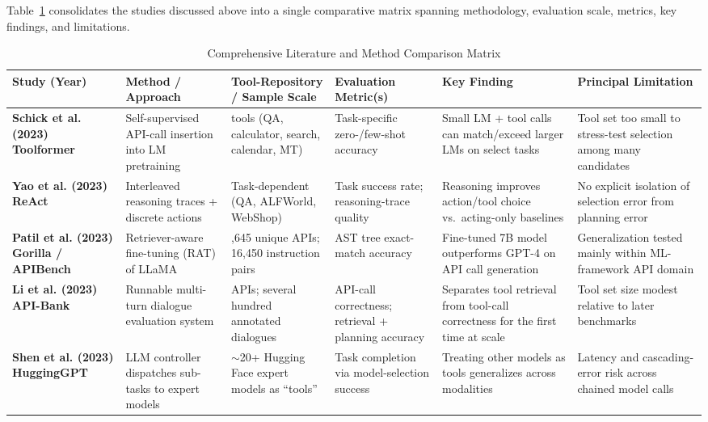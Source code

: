 \documentclass[acmsmall]{acmart}
\begin{document}
Table~\ref{tab:comparison} consolidates the studies discussed above into a single comparative matrix spanning methodology, evaluation scale, metrics, key findings, and limitations.

\begin{table}[!t]
  \centering
  \caption{Comprehensive Literature and Method Comparison Matrix}
  \label{tab:comparison}
  \setlength{\tabcolsep}{2pt}
  \renewcommand{\arraystretch}{0.82}
  \scriptsize
  \begin{tabularx}{\textwidth}{@{}>{\raggedright\arraybackslash}X>{\raggedright\arraybackslash}X>{\raggedright\arraybackslash}X>{\raggedright\arraybackslash}X>{\raggedright\arraybackslash}X>{\raggedright\arraybackslash}X@{}}
    \toprule
    \textbf{Study (Year)} & \textbf{Method / Approach} & \textbf{Tool-Repository / Sample Scale} & \textbf{Evaluation Metric(s)} & \textbf{Key Finding} & \textbf{Principal Limitation} \\
    \midrule
    \textbf{Schick et al. (2023) Toolformer} & Self-supervised API-call insertion into LM pretraining & 5 tools (QA, calculator, search, calendar, MT) & Task-specific zero-/few-shot accuracy & Small LM + tool calls can match/exceed larger LMs on select tasks & Tool set too small to stress-test selection among many candidates \\
    \textbf{Yao et al. (2023) ReAct} & Interleaved reasoning traces + discrete actions & Task-dependent (QA, ALFWorld, WebShop) & Task success rate; reasoning-trace quality & Reasoning improves action/tool choice vs.\ acting-only baselines & No explicit isolation of selection error from planning error \\
    \textbf{Patil et al. (2023) Gorilla / APIBench} & Retriever-aware fine-tuning (RAT) of LLaMA & 1,645 unique APIs; 16,450 instruction pairs & AST tree exact-match accuracy & Fine-tuned 7B model outperforms GPT-4 on API call generation & Generalization tested mainly within ML-framework API domain \\
    \textbf{Li et al. (2023) API-Bank} & Runnable multi-turn dialogue evaluation system & 73 APIs; several hundred annotated dialogues & API-call correctness; retrieval + planning accuracy & Separates tool retrieval from tool-call correctness for the first time at scale & Tool set size modest relative to later benchmarks \\
    \textbf{Shen et al. (2023) HuggingGPT} & LLM controller dispatches sub-tasks to expert models & $\sim$20+ Hugging Face expert models as ``tools'' & Task completion via model-selection success & Treating other models as tools generalizes across modalities & Latency and cascading-error risk across chained model calls \\

\end{tabularx}
\end{table}
\end{document}
